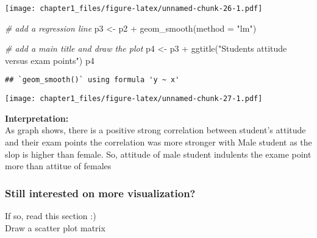 \documentclass[
]{article}
\newenvironment{Shaded}{\begin{snugshade}}{\end{snugshade}}
\newcommand{\AttributeTok}[1]{\textcolor[rgb]{0.77,0.63,0.00}{#1}}
\newcommand{\CommentTok}[1]{\textcolor[rgb]{0.56,0.35,0.01}{\textit{#1}}}
\newcommand{\DecValTok}[1]{\textcolor[rgb]{0.00,0.00,0.81}{#1}}
\newcommand{\FunctionTok}[1]{\textcolor[rgb]{0.00,0.00,0.00}{#1}}
\newcommand{\NormalTok}[1]{#1}
\newcommand{\OtherTok}[1]{\textcolor[rgb]{0.56,0.35,0.01}{#1}}
\newcommand{\SpecialCharTok}[1]{\textcolor[rgb]{0.00,0.00,0.00}{#1}}
\newcommand{\StringTok}[1]{\textcolor[rgb]{0.31,0.60,0.02}{#1}}
\begin{document}
\texttt{[image: chapter1\_files/figure-latex/unnamed-chunk-26-1.pdf]}

\begin{Shaded}
\begin{Highlighting}[]
\CommentTok{\# add a regression line}
\NormalTok{p3 }\OtherTok{\textless{}{-}}\NormalTok{ p2 }\SpecialCharTok{+} \FunctionTok{geom\_smooth}\NormalTok{(}\AttributeTok{method =} \StringTok{"lm"}\NormalTok{)}

\CommentTok{\# add a main title and draw the plot}
\NormalTok{p4 }\OtherTok{\textless{}{-}}\NormalTok{ p3 }\SpecialCharTok{+} \FunctionTok{ggtitle}\NormalTok{(}\StringTok{"Student\textquotesingle{}s attitude versus exam points"}\NormalTok{)}
\NormalTok{p4}
\end{Highlighting}
\end{Shaded}

\begin{verbatim}
## `geom_smooth()` using formula 'y ~ x'
\end{verbatim}

\texttt{[image: chapter1\_files/figure-latex/unnamed-chunk-27-1.pdf]}

\textbf{Interpretation:}\\
As graph shows, there is a positive strong correlation between student's
attitude and their exam points the correlation was more stronger with
Male student as the slop is higher than female. So, attitude of male
student indulents the exame point more than attitue of females

\hypertarget{still-interested-on-more-visualization}{%
\subsubsection{Still interested on more
visualization?}\label{still-interested-on-more-visualization}}

If so, read this section :)\\
Draw a scatter plot matrix

\begin{Shaded}
\end{Shaded}
\end{document}
